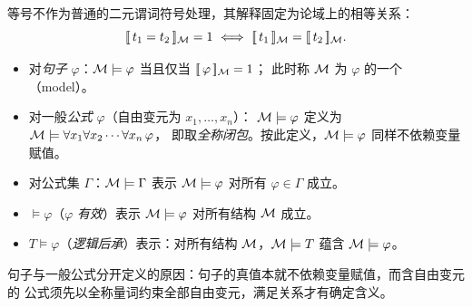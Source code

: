 \begin{remark}[等号的解释]
等号不作为普通的二元谓词符号处理，其解释固定为论域上的相等关系：
\[
  \sem{t_1=t_2}_{\M}=1 \ \Longleftrightarrow\ \sem{t_1}_{\M}=\sem{t_2}_{\M}.
\]
\end{remark}

\begin{definition}[满足、模型、逻辑后承]\label{def:satisfaction}
\leavevmode
\begin{itemize}[leftmargin=1.3em,itemsep=2pt]
  \item 对\emph{句子} $\varphi$：$\mathcal{M}\models\varphi$ 当且仅当 $[\![\,\varphi\,]\!]_{\mathcal{M}}=1$；
        此时称 $\mathcal{M}$ 为 $\varphi$ 的一个（model）。
  \item 对一般\emph{公式} $\varphi$（自由变元为 $x_1,\ldots,x_n$）：
        $\mathcal{M}\models\varphi$ 定义为 $\mathcal{M}\models\forall x_1\forall x_2\cdots\forall x_n\,\varphi$，
        即取\emph{全称闭包}。按此定义，$\mathcal{M}\models\varphi$ 同样不依赖变量赋值。
  \item 对公式集 $\Gamma$：$\mathcal{M}\models\Gamma$ 表示 $\mathcal{M}\models\varphi$ 对所有 $\varphi\in\Gamma$ 成立。
  \item $\models\varphi$（$\varphi$ \emph{有效}）表示 $\mathcal{M}\models\varphi$ 对所有结构 $\mathcal{M}$ 成立。
  \item $T\models\varphi$（\emph{逻辑后承}）表示：对所有结构 $\mathcal{M}$，$\mathcal{M}\models T$ 蕴含 $\mathcal{M}\models\varphi$。
\end{itemize}
\end{definition}

句子与一般公式分开定义的原因：句子的真值本就不依赖变量赋值，而含自由变元的
公式须先以全称量词约束全部自由变元，满足关系才有确定含义。
